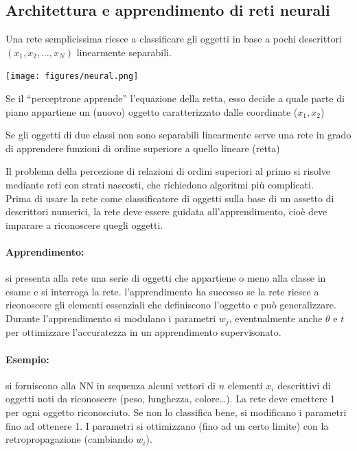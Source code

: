 \documentclass{article}
\begin{document}
\subsection{Architettura e apprendimento di reti neurali}
Una rete semplicissima riesce a classificare gli oggetti in base a
pochi descrittori $(x_1,x_2,\dots,x_N)$ linearmente separabili.
\begin{center}
    \texttt{[image: figures/neural.png]}
\end{center}
\begin{minipage}[t]{.5\textwidth}
    \begin{flushleft}
    Se il “perceptrone apprende” l'equazione della
    retta, esso decide a quale parte di piano
    appartiene un (nuovo) oggetto caratterizzato
    dalle coordinate ($x_1,x_2$)
    \end{flushleft}
\end{minipage}%
\begin{minipage}[t]{.5\textwidth}
    \begin{flushright}
        Se gli oggetti di due classi non sono
        separabili linearmente serve una rete in
        grado di apprendere funzioni di ordine
        superiore a quello lineare (retta)
    \end{flushright}
\end{minipage}
Il problema della percezione di relazioni di ordini superiori al primo
si risolve mediante reti con strati nascosti, che richiedono
algoritmi più complicati.\\
Prima di usare la rete come classificatore di oggetti sulla base di un
assetto di descrittori numerici, la rete deve essere guidata
all'apprendimento, cioè deve imparare a riconoscere quegli oggetti.
\paragraph{Apprendimento:} si presenta alla rete una serie di oggetti che
appartiene o meno alla classe in esame e si interroga la rete.
l'apprendimento ha successo se la rete riesce a riconoscere gli
elementi essenziali che definiscono l'oggetto e può generalizzare.\\
Durante l'apprendimento si modulano i parametri $w_j$, eventualmente
anche $\theta$ e $t$ per ottimizzare l'accuratezza in un apprendimento
supervisonato.
\paragraph{Esempio:} si forniscono alla NN in sequenza alcuni vettori di $n$
elementi $x_i$ descrittivi di oggetti noti da riconoscere (peso,
lunghezza, colore…). La rete deve emettere 1 per ogni oggetto riconosciuto. Se non lo classifica
bene, si modificano i parametri fino ad ottenere 1. I parametri si
ottimizzano (fino ad un certo limite) con la retropropagazione (cambiando $w_i$).
\end{document}
